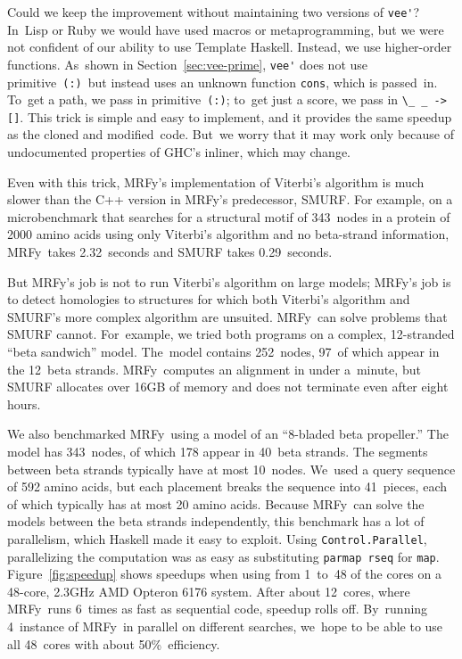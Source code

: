\documentclass[preprint,nonatbib,blockstyle,times]{sigplanconf}
\newcommand\mrfy{MRFy} %
\newcommand\primcons{\texttt{\small(:)}}
\newcommand\figref[1]{Figure~\ref{#1}}
\newcommand\secref[1]{Section~\ref{sec:#1}}
\begin{document}
Could we keep the improvement without 
maintaining two versions of \verb+vee'+?
In~Lisp or Ruby we would have used macros or metaprogramming,
but we were not confident of our ability to use Template Haskell.
Instead, we use higher-order functions.
As~shown in \secref{vee-prime},
\verb+vee'+ does not use primitive~\primcons\ but instead
uses an unknown function \texttt{cons}, which is
passed~in.
To~get a path, we pass in primitive~\primcons;
to~get just a score, we pass in
\verb+\_ _ -> []+.
This trick is simple and easy to implement, and it provides the same
speedup as the cloned and modified~code.
But~we worry that it may work only because of
undocumented properties of GHC's inliner, which may 
change.

Even with this trick,
MRFy's implementation of Viterbi's algorithm is much
slower than the C++ version in \mrfy's predecessor,
SMURF.
\ifpagetuning\vadjust{\break}\fi
For example, on a microbenchmark that searches for a
structural motif of 343~nodes in a protein of 2000 amino acids
using only Viterbi's algorithm and no beta-strand information,
\mrfy\ takes 2.32~seconds and
SMURF takes 0.29~seconds.

But \mrfy's job is not to run Viterbi's algorithm on large models;
\mrfy's job is to detect homologies to structures for which both Viterbi's
algorithm and SMURF's more complex algorithm are unsuited.
\mrfy\ can solve problems that SMURF cannot.
For~example, we tried both programs on a complex, 12-stranded ``beta
sandwich'' 
model.
The~model contains 252~nodes,
97~of which appear in the 12~beta strands.
\mrfy\ computes an alignment in under a~minute,
but SMURF allocates
over 16GB of memory and does not terminate even after eight hours.

We also benchmarked \mrfy\ using a model of an ``8-bladed beta propeller.''
The model has 343~nodes, of which 178 appear in 40~beta strands.
The segments between beta strands typically have at most 10~nodes.
We~used a query sequence of 592 amino acids, but each placement breaks
the sequence into 41~pieces, each of which typically has at most 20 amino
acids.
Because \mrfy\ can solve the models between the beta strands independently,
this benchmark has a lot of parallelism,
which Haskell made it easy to exploit.
Using
\texttt{Control.Parallel}, parallelizing the computation was as easy
as  substituting
\texttt{parmap rseq} for \texttt{map}.
\figref{fig:speedup} shows speedups when using from 
 1~to~48 of the cores 
on a 48-core, 2.3GHz AMD Opteron 6176 system.
After about 12~cores, where \mrfy\ runs 6~times as fast as sequential
code, speedup rolls off.
By~running 4~instance of \mrfy\ in parallel on different searches,
we~hope to be able to use all 48~cores with about 50\%~efficiency.
{\ifpagetuning{} \par\fi}
\end{document}

